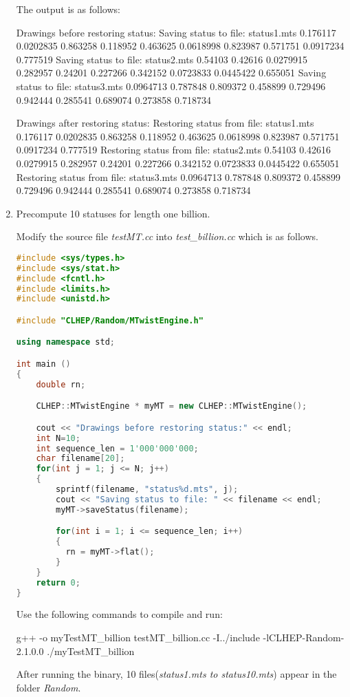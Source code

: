 \documentclass[a4paper, 12pt]{report}
\begin{document}
\begin{enumerate}
        The output is as follows:
        \begin{messageshell}
Drawings before restoring status:
Saving status to file: status1.mts
0.176117
0.0202835
0.863258
0.118952
0.463625
0.0618998
0.823987
0.571751
0.0917234
0.777519
Saving status to file: status2.mts
0.54103
0.42616
0.0279915
0.282957
0.24201
0.227266
0.342152
0.0723833
0.0445422
0.655051
Saving status to file: status3.mts
0.0964713
0.787848
0.809372
0.458899
0.729496
0.942444
0.285541
0.689074
0.273858
0.718734
        \end{messageshell}
        \begin{messageshell}
Drawings after restoring status:
Restoring status from file: status1.mts
0.176117
0.0202835
0.863258
0.118952
0.463625
0.0618998
0.823987
0.571751
0.0917234
0.777519        
Restoring status from file: status2.mts
0.54103
0.42616
0.0279915
0.282957
0.24201
0.227266
0.342152
0.0723833
0.0445422
0.655051
Restoring status from file: status3.mts
0.0964713
0.787848
0.809372
0.458899
0.729496
0.942444
0.285541
0.689074
0.273858
0.718734
        \end{messageshell}
    \item Precompute 10 statuses for length one billion.

        Modify the source file \emph{testMT.cc} into \emph{test\_billion.cc} which is as follows.
        \begin{lstlisting}[language=C++]
#include <sys/types.h>
#include <sys/stat.h>
#include <fcntl.h>
#include <limits.h>
#include <unistd.h>

#include "CLHEP/Random/MTwistEngine.h"

using namespace std;

int main ()
{
    double rn;

    CLHEP::MTwistEngine * myMT = new CLHEP::MTwistEngine();

    cout << "Drawings before restoring status:" << endl;
    int N=10;
    int sequence_len = 1'000'000'000;
    char filename[20];
    for(int j = 1; j <= N; j++)
    {
        sprintf(filename, "status%d.mts", j);
        cout << "Saving status to file: " << filename << endl;
        myMT->saveStatus(filename);

        for(int i = 1; i <= sequence_len; i++)
        {
          rn = myMT->flat();
        }
    }
    return 0;
}
        \end{lstlisting}
        Use the following commands to compile and run:
        \begin{commandshell}
            g++ -o myTestMT_billion testMT_billion.cc -I../include -lCLHEP-Random-2.1.0.0
            ./myTestMT_billion
        \end{commandshell}
        After running the binary, 10 files(\emph{status1.mts to status10.mts}) appear in the folder \emph{Random}.


\end{enumerate}
\end{document}
